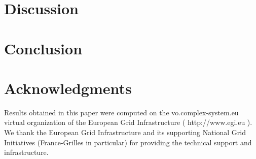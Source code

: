 \documentclass[runningheads,a4paper]{llncs2e/llncs}
\begin{document}
\section{Discussion}




\section{Conclusion}






\section*{Acknowledgments}

Results obtained in this paper were computed on the vo.complex-system.eu virtual organization of the European Grid Infrastructure ( http://www.egi.eu ). We thank the European Grid Infrastructure and its supporting National Grid Initiatives (France-Grilles in particular) for providing the technical support and infrastructure.





%
\end{document}
